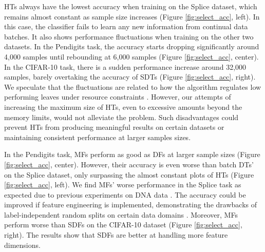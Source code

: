 HTs always have the lowest accuracy when training on the Splice dataset, which remains almost constant as sample size increases (Figure \ref{fig:select_acc}, left). In this case, the classifier fails to learn any new information from continual data batches.
It also shows performance fluctuations when training on the other two datasets. In the Pendigits task, the accuracy starts dropping significantly around 4,000 samples until rebounding at 6,000 samples (Figure \ref{fig:select_acc}, center). In the CIFAR-10 task, there is a sudden performance increase around 32,000 samples, barely overtaking the accuracy of SDTs (Figure \ref{fig:select_acc}, right).
We speculate that the fluctuations are related to how the algorithm regulates low performing leaves under resource constraints \citep{domingos_mining_2000}. However, our attempts of increasing the maximum size of HTs, even to excessive amounts beyond the memory limits, would not alleviate the problem. 
Such disadvantages could prevent HTs from producing meaningful results on certain datasets or maintaining consistent performance at larger samples sizes.

In the Pendigits task, MFs perform as good as DFs at larger sample sizes (Figure \ref{fig:select_acc}, center). However, their accuracy is even worse than batch DTs' on the Splice dataset, only surpassing the almost constant plots of HTs (Figure \ref{fig:select_acc}, left). 
We find MFs' worse performance in the Splice task as expected due to previous experiments on DNA data \citep{lakshminarayanan_mondrian_2014}. 
The accuracy could be improved if feature engineering is implemented, demonstrating the drawbacks of label-independent random splits on certain data domains \citep{roy_mondrian_2009, ziegler_mining_2014}.
Moreover, MFs perform worse than SDFs on the CIFAR-10 dataset (Figure \ref{fig:select_acc}, right). The results show that SDFs are better at handling more feature dimensions.


